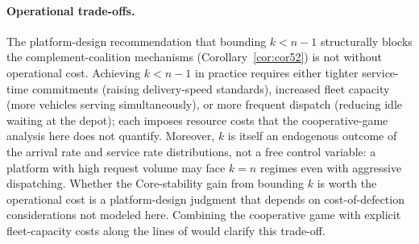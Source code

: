 \documentclass[11pt]{article}
\theoremstyle{plain}
\theoremstyle{definition}
\theoremstyle{remark}
\begin{document}
\paragraph{Operational trade-offs.} The platform-design recommendation that bounding $k<n-1$ structurally blocks the complement-coalition mechanisms (Corollary~\ref{cor:cor52}) is not without operational cost. Achieving $k<n-1$ in practice requires either tighter service-time commitments (raising delivery-speed standards), increased fleet capacity (more vehicles serving simultaneously), or more frequent dispatch (reducing idle waiting at the depot); each imposes resource costs that the cooperative-game analysis here does not quantify. Moreover, $k$ is itself an endogenous outcome of the arrival rate and service rate distributions, not a free control variable: a platform with high request volume may face $k=n$ regimes even with aggressive dispatching. Whether the Core-stability gain from bounding $k$ is worth the operational cost is a platform-design judgment that depends on cost-of-defection considerations not modeled here. Combining the cooperative game with explicit fleet-capacity costs along the lines of \citet{ozener2008allocating} would clarify this trade-off.
\end{document}
